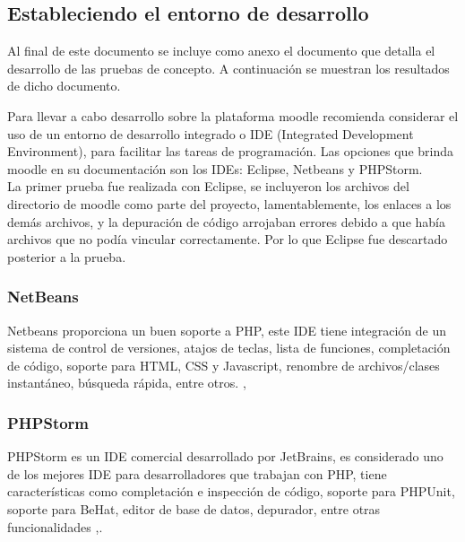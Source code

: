 \subsection{Estableciendo el entorno de desarrollo}

 Al final de este documento se incluye como anexo el documento que detalla el desarrollo de las pruebas de concepto. A continuación se muestran los resultados de dicho documento.

Para llevar a cabo desarrollo sobre la plataforma moodle recomienda considerar el uso de un entorno de desarrollo integrado o IDE (Integrated Development Environment), para facilitar las tareas de programación. Las opciones que brinda moodle en su documentación son los IDEs: Eclipse, Netbeans y PHPStorm.\\

\noindent La primer prueba fue realizada con Eclipse, se incluyeron los archivos del directorio de moodle como parte del proyecto, lamentablemente, los enlaces a los demás archivos, y la depuración de código arrojaban errores debido a que había archivos que no podía vincular correctamente. Por lo que Eclipse fue descartado posterior a la prueba.

\subsubsection{NetBeans}

Netbeans proporciona un buen soporte a PHP, este IDE tiene integración de un sistema de control de versiones, atajos de teclas, lista de funciones, completación de código, soporte para HTML, CSS y Javascript, renombre de archivos/clases instantáneo, búsqueda rápida, entre otros. \cite{NetBeans}, \cite{moodleNetbeans}


\subsubsection{PHPStorm}

PHPStorm es un IDE comercial desarrollado por JetBrains, es considerado uno de los mejores IDE para desarrolladores que trabajan con PHP, tiene características como completación e inspección de código, soporte para PHPUnit, soporte para BeHat, editor de base de datos, depurador, entre otras funcionalidades \cite{PHPStorm},\cite{  moodlePHPStorm}.

